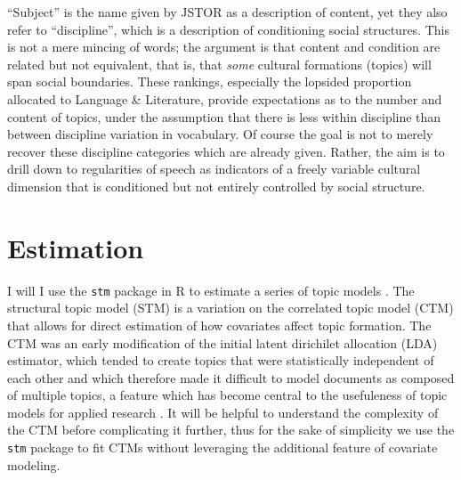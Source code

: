 \documentclass[]{book}
\theoremstyle{definition}
\theoremstyle{definition}
\theoremstyle{definition}
\theoremstyle{remark}
\begin{document}
``Subject'' is the name given by JSTOR as a description of content, yet
they also refer to ``discipline'', which is a description of
conditioning social structures. This is not a mere mincing of words; the
argument is that content and condition are related but not equivalent,
that is, that \emph{some} cultural formations (topics) will span social
boundaries. These rankings, especially the lopsided proportion allocated
to Language \& Literature, provide expectations as to the number and
content of topics, under the assumption that there is less within
discipline than between discipline variation in vocabulary. Of course
the goal is not to merely recover these discipline categories which are
already given. Rather, the aim is to drill down to regularities of
speech as indicators of a freely variable cultural dimension that is
conditioned but not entirely controlled by social structure.

\hypertarget{estimation}{%
\section{Estimation}\label{estimation}}

I will I use the \texttt{stm} package in R to estimate a series of topic
models \citep{Robertsstructuraltopicmodel2013, Roberts2018stm}. The
structural topic model (STM) is a variation on the correlated topic
model (CTM) that allows for direct estimation of how covariates affect
topic formation. The CTM was an early modification of the initial latent
dirichilet allocation (LDA) estimator, which tended to create topics
that were statistically independent of each other and which therefore
made it difficult to model documents as composed of multiple topics, a
feature which has become central to the usefuleness of topic models for
applied research \citep{Blei2007correlated}. It will be helpful to
understand the complexity of the CTM before complicating it further,
thus for the sake of simplicity we use the \texttt{stm} package to fit
CTMs without leveraging the additional feature of covariate modeling.
\end{document}
